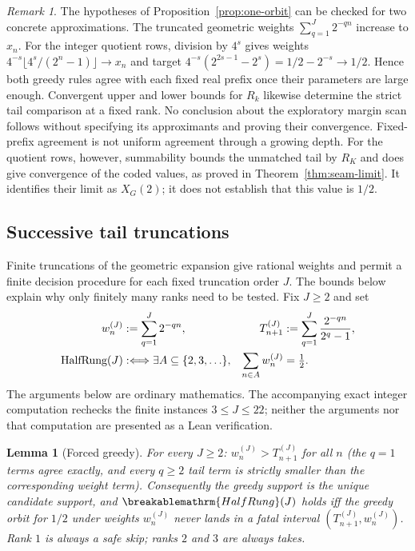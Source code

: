 \documentclass[11pt]{article}
\theoremstyle{plain}
\newtheorem{lem}[thm]{Lemma}
\theoremstyle{definition}
\theoremstyle{remark}
\newtheorem{rem}[thm]{Remark}
\renewcommand{\mathrm}[1]{\ifmmode\breakablemathrm{#1}\else\textrm{#1}\fi}%
\begin{document}
\begin{rem}
The hypotheses of Proposition~\ref{prop:one-orbit} can be checked for
two concrete approximations.  The truncated geometric weights
$\sum_{q=1}^{J}2^{-qn}$ increase to $x_n$.  For the integer quotient
rows, division by $4^s$ gives weights
$4^{-s}\lfloor4^s/(2^n-1)\rfloor\to x_n$ and target
$4^{-s}(2^{2s-1}-2^s)=1/2-2^{-s}\to1/2$.
Hence both greedy rules agree with each fixed real prefix once their
parameters are large enough.  Convergent upper and lower bounds for
$R_k$ likewise determine the strict tail comparison at a fixed rank.
No conclusion about the exploratory margin scan follows without specifying
its approximants and proving their convergence.  Fixed-prefix agreement is not uniform agreement through a growing
depth.  For the quotient rows, however, summability bounds the unmatched
tail by $R_K$ and does give convergence of the coded values, as proved
in Theorem~\ref{thm:seam-limit}.  It identifies their limit as
$X_G(2)$; it does not establish that this value is $1/2$.
\end{rem}

\subsection*{Successive tail truncations}

Finite truncations of the geometric expansion give rational weights
and permit a finite decision procedure for each fixed truncation
order $J$.  The bounds below explain why only finitely many ranks
need to be tested.  Fix $J\ge2$ and set
\[
\begin{aligned}
w_n^{(J)}&:=\sum_{q=1}^{J}2^{-qn}, &
T_{n+1}^{(J)}&:=\sum_{q=1}^{J}\frac{2^{-qn}}{2^q-1},\\
\mathrm{HalfRung}(J)&:\Longleftrightarrow
\exists A\subseteq\{2,3,\ldots\},&
\sum_{n\in A}w_n^{(J)}&=\tfrac12.
\end{aligned}
\]
The arguments below are ordinary mathematics.  The accompanying exact
integer computation rechecks the finite instances $3\le J\le22$; neither
the arguments nor that computation are presented as a Lean verification.

\begin{lem}[Forced greedy]
\label{lem:tr-forced-greedy}
For every $J\ge2$: $w_n^{(J)}>T_{n+1}^{(J)}$ for all $n$ (the $q=1$ terms agree exactly, and every
$q\ge2$ tail term is strictly smaller than the corresponding weight term). Consequently the greedy support is the unique candidate support, and
$\mathrm{HalfRung}(J)$ holds iff the greedy orbit for $1/2$ under weights $w_n^{(J)}$ never lands in
a fatal interval $(T_{n+1}^{(J)},w_n^{(J)})$. Rank $1$ is always a safe skip; ranks $2$ and $3$ are
always takes.
\end{lem}
\end{document}

